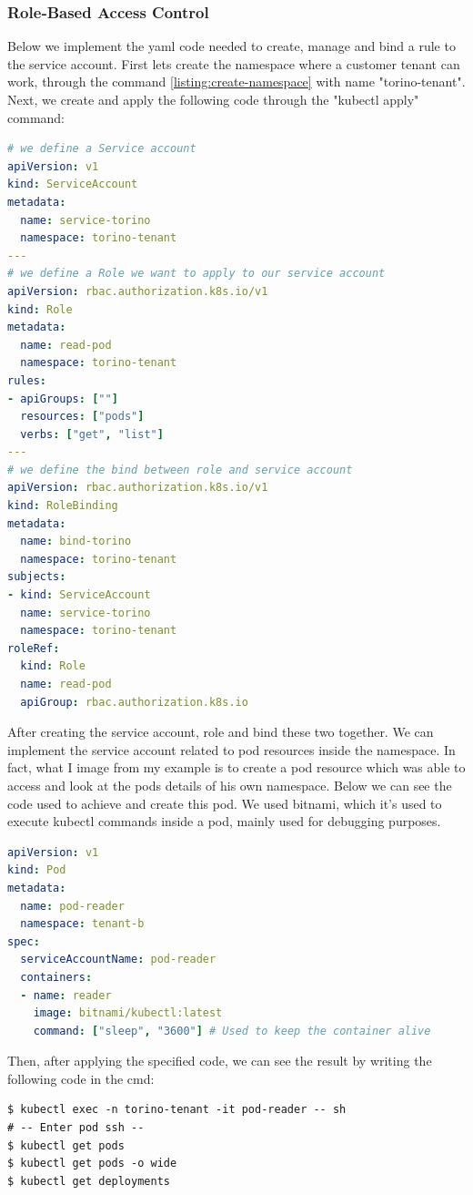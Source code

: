 \subsubsection{Role‑Based Access Control}
\label{subsub:role-based access control}
Below we implement the yaml code needed to create, manage and bind a rule to the service account. First lets create the namespace where a customer tenant can work, through the command \autoref{listing:create-namespace} with name "torino-tenant". Next, we create and apply the following code through the "kubectl apply" command:
\begin{lstlisting}[language=yaml, caption={ServiceAccount, rule and ruleBinding}, label={lst:SerAcc-rule-binding}]
# we define a Service account
apiVersion: v1
kind: ServiceAccount
metadata:
  name: service-torino
  namespace: torino-tenant
---
# we define a Role we want to apply to our service account
apiVersion: rbac.authorization.k8s.io/v1
kind: Role
metadata:
  name: read-pod
  namespace: torino-tenant
rules:
- apiGroups: [""]
  resources: ["pods"]
  verbs: ["get", "list"]
---
# we define the bind between role and service account
apiVersion: rbac.authorization.k8s.io/v1
kind: RoleBinding
metadata:
  name: bind-torino
  namespace: torino-tenant
subjects:
- kind: ServiceAccount
  name: service-torino
  namespace: torino-tenant
roleRef:
  kind: Role
  name: read-pod
  apiGroup: rbac.authorization.k8s.io
\end{lstlisting}
After creating the service account, role and bind these two together. We can implement the service account related to pod resources inside the namespace. In fact, what I image from my example is to create a pod resource which was able to access and look at the pods details of his own namespace. Below we can see the code used to achieve and create this pod. We used bitnami, which it's used to execute kubectl commands inside a pod, mainly used for debugging purposes.
\begin{lstlisting}[language=yaml, caption={Lauch pod with specific ServiceAccount}, label={lst:serviceAccount-pod}]
apiVersion: v1
kind: Pod
metadata:
  name: pod-reader
  namespace: tenant-b
spec:
  serviceAccountName: pod-reader
  containers:
  - name: reader
    image: bitnami/kubectl:latest
    command: ["sleep", "3600"] # Used to keep the container alive
\end{lstlisting}
Then, after applying the specified code, we can see the result by writing the following code in the cmd: 
\begin{lstlisting}[caption={Show constraints deployment}]
$ kubectl exec -n torino-tenant -it pod-reader -- sh
# -- Enter pod ssh --
$ kubectl get pods
$ kubectl get pods -o wide
$ kubectl get deployments
\end{lstlisting}
